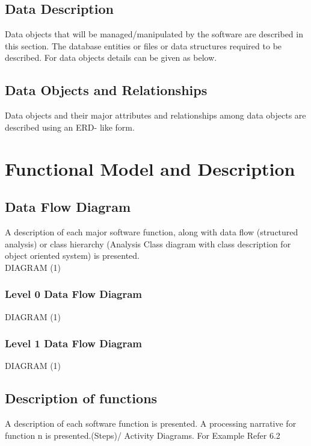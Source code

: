 \documentclass{report} %
\begin{document}
			\subsection{Data Description}
			Data objects that will be managed/manipulated by the software are described in this section. The database entities or files or data structures required to be described. For data objects details can be given as below.
			
			\subsection{Data Objects and Relationships}
			Data objects and their major attributes and relationships among data objects are described using an ERD- like form.
			
		\section{Functional Model and Description}
			
			\subsection{Data Flow Diagram}	
			A description of each major software function, along with data flow (structured analysis) or class hierarchy (Analysis Class diagram with class description for object oriented system) is presented. \\
			
			DIAGRAM (1)
			
				\subsubsection{Level 0 Data Flow Diagram}
				
				DIAGRAM (1)
				
				\subsubsection{Level 1 Data Flow Diagram}
				
				DIAGRAM (1)
			
			\subsection{Description of functions}
			A description of each software function is presented. A processing narrative for
			function n is presented.(Steps)/ Activity Diagrams. For Example Refer 6.2 \\
			
\end{document}
